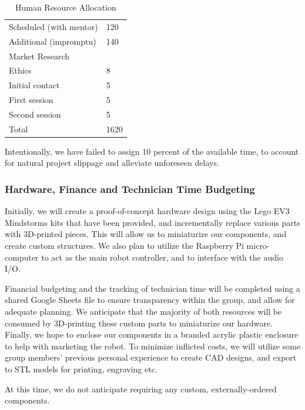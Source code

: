 \documentclass{article}
\begin{document}
\begin{table}[]
\begin{center}
\begin{small}
\begin{tabular}{|l|l|}
\quad Scheduled (with mentor)        & 120   \\
\quad Additional (impromptu)         & 140   \\ \hline
Market Research                &       \\
\quad Ethics                         & 8     \\
\quad Initial contact                & 5     \\
\quad First session                  & 5     \\
\quad Second session                 & 5     \\ \hline
Total                          & 1620  \\ \hline
\end{tabular}
\end{small}
\caption{Human Resource Allocation}
\label{table:hours}
\end{center}
\end{table}

Intentionally, we have failed to assign 10 percent of the available time, to account for natural project slippage and alleviate unforeseen delays.

\subsubsection{Hardware, Finance and Technician Time Budgeting}

Initially, we will create a proof-of-concept hardware design using the Lego EV3 Mindstorms kits that have been provided, and incrementally replace various parts with 3D-printed pieces. This will allow us to miniaturize our components, and create custom structures. We also plan to utilize the Raspberry Pi micro-computer to act as the main robot controller, and to interface with the audio I/O.

Financial budgeting and the tracking of technician time will be completed using a shared Google Sheets file to ensure transparency within the group, and allow for adequate planning. We anticipate that the majority of both resources will be consumed by 3D-printing these custom parts to miniaturize our hardware. Finally, we hope to enclose our components in a branded acrylic plastic enclosure to help with marketing the robot. To minimize inflicted costs, we will utilize some group members' previous personal experience to create CAD designs, and export to STL models for printing, engraving etc.

At this time, we do not anticipate requiring any custom, externally-ordered components.
\end{document}
